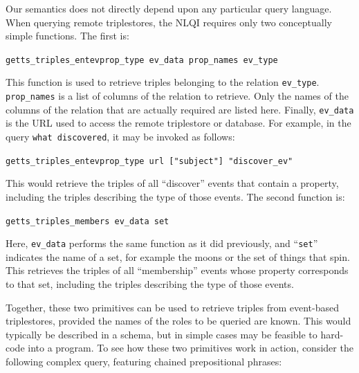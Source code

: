 \documentclass[../main.tex]{subfiles}
\begin{document}
\begin{refsection}
Our semantics does not directly depend upon any particular query language.
When querying remote triplestores, the NLQI requires only two conceptually simple functions.  The first is:

\examplespacing

\texttt{getts\_triples\_entevprop\_type ev\_data prop\_names ev\_type}

\examplespacing

\noindent This function is used to retrieve triples belonging to the relation \texttt{ev\_type}.  \linebreak \texttt{prop\_names} is a list of columns of the relation to retrieve.  Only the names of the columns of the relation that are actually required are listed here.  Finally, \linebreak \texttt{ev\_data} is the URL used to access the remote triplestore or database.  For example, in the query \texttt{what discovered}, it may be invoked as follows:


\examplespacing

\texttt{getts\_triples\_entevprop\_type url ["subject"] "discover\_ev"}

\examplespacing

\noindent This would retrieve the triples of all ``discover'' events that contain a  property, including the triples describing the type of those events.  The second function is:

\examplespacing

\texttt{getts\_triples\_members ev\_data set}

\examplespacing

\noindent Here, \texttt{ev\_data} performs the same function as it did previously, and ``\texttt{set}'' indicates the name of a set, for example the moons or the set of things that spin.  This retrieves the triples of all ``membership'' events whose  property corresponds to that set, including the triples describing the type of those events.

Together, these two primitives can be used to retrieve triples from event-based triplestores, provided the names of the roles to be queried are known.  This would typically be described in a schema, but in simple cases may be feasible to hard-code into a program. To see how these two primitives work in action, consider the following complex query, featuring chained prepositional phrases:


\end{refsection}
\end{document}

